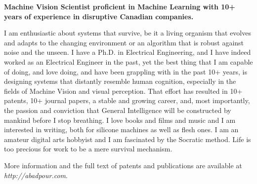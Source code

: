 \onehalfspace
\textbf{\large Machine Vision Scientist proficient in Machine Learning with 10+ years of experience in disruptive Canadian companies.}
\singlespace

\vspace{1cm}

I am enthusiastic about systems that survive, be it a living organism that evolves and adapts to the changing environment or an algorithm that is robust against noise and the unseen. I have a Ph.D. in Electrical Engineering, and I have indeed worked as an Electrical Engineer in the past, yet the best thing that I am capable of doing, and love doing, and have been grappling with in the past 10+ years, is designing systems that distantly resemble human cognition, especially in the fields of Machine Vision and visual perception. That effort has resulted in 10+ patents, 10+ journal papers, a stable and growing career, and, most importantly, the passion and conviction that General Intelligence will be constructed by mankind before I stop breathing. I love books and films and music and I am interested in writing, both for silicone machines as well as flesh ones. I am an amateur digital arts hobbyist and I am fascinated by the Socratic method. Life is too precious for work to be a mere survival mechanism.

\vspace{0.5cm}
More information and the full text of patents and publications are available at \emph{http://abadpour.com}.

\vspace{1.5cm}
